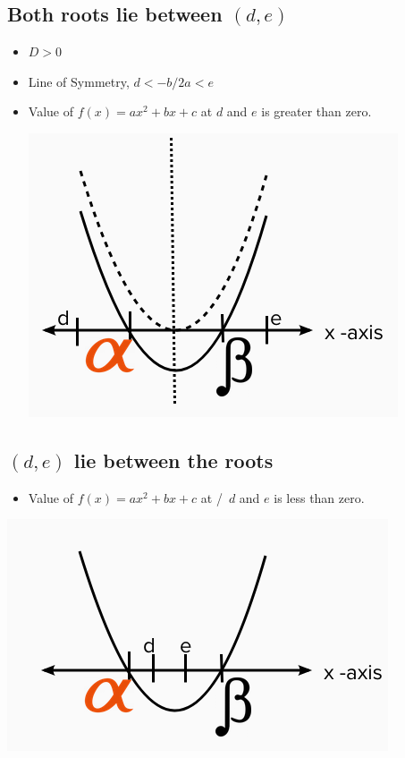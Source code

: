 \documentclass{book}
\begin{document}
	\subsection{Both roots lie between $(d,e)$}
	\begin{itemize}
		\item $D>0$
		\item Line of Symmetry, $d < -b/2a < e$
		\item Value of $f(x) = ax^2 + bx + c$ at $d$ and $e$ is greater than zero.
		
		\includegraphics[scale=0.6]{condition3}
	\end{itemize}
	
	\subsection{$(d,e)$ lie between the roots}
	\begin{itemize}
		\item Value of $f(x) = ax^2 + bx + c$ at
		/\ $d$ and $e$ is less than zero.
	\end{itemize}
	
	\includegraphics[scale=0.6]{condition4}
	
\end{document}
